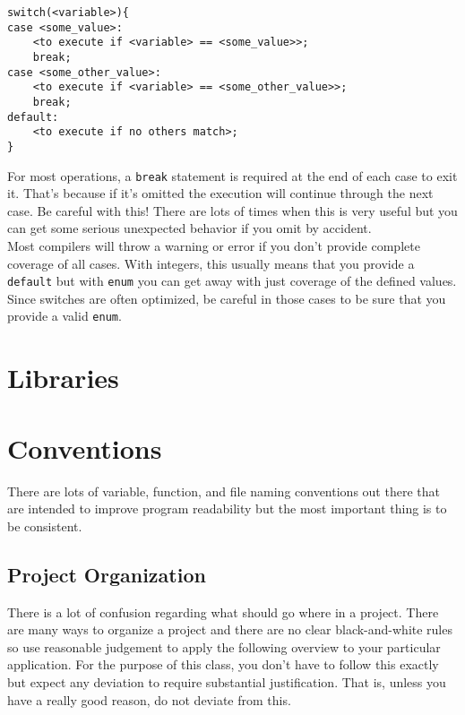 \documentclass[10pt]{article}
\begin{document}
\begin{lstlisting}[label=lst-basic-switch,caption=Basic switch]
switch(<variable>){
case <some_value>:
	<to execute if <variable> == <some_value>>;
	break;
case <some_other_value>:
	<to execute if <variable> == <some_other_value>>;
	break;
default:
	<to execute if no others match>;
}
\end{lstlisting}

For most operations, a \texttt{break} statement is required at the end of each case to exit it. That's because if it's omitted the execution will continue through the next case. Be careful with this! There are lots of times when this is very useful but you can get some serious unexpected behavior if you omit by accident. \\

Most compilers will throw a warning or error if you don't provide complete coverage of all cases. With integers, this usually means that you provide a \texttt{default} but with \texttt{enum} you can get away with just coverage of the defined values. Since switches are often optimized, be careful in those cases to be sure that you provide a valid \texttt{enum}.

\section{Libraries}

\section{Conventions}

There are lots of variable, function, and file naming conventions out there that are intended to improve program readability but the most important thing is to be consistent.

\subsection{Project Organization}

There is a lot of confusion regarding what should go where in a project. There are many ways to organize a project and there are no clear black-and-white rules so use reasonable judgement to apply the following overview to your particular application. For the purpose of this class, you don't have to follow this exactly but expect any deviation to require substantial justification. That is, unless you have a really good reason, do not deviate from this. \\
\end{document}
